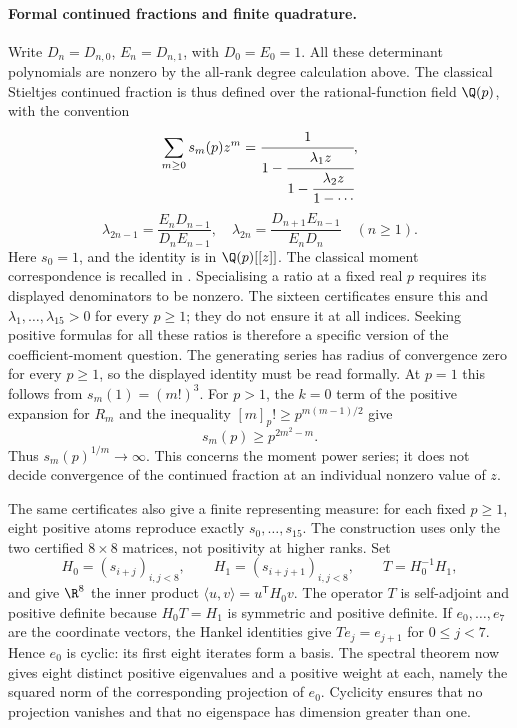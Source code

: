 \paragraph{Formal continued fractions and finite quadrature.}
Write $D_n=D_{n,0}$, $E_n=D_{n,1}$, with $D_0=E_0=1$.
All these determinant polynomials are nonzero by the all-rank degree
calculation above. The classical Stieltjes continued fraction is thus
defined over the rational-function field $\Q(p)$, with the convention
\[
 \sum_{m\ge0}s_m(p)z^m
 =\cfrac{1}{1-\cfrac{\lambda_1z}{1-\cfrac{\lambda_2z}{1-\cdots}}},
\]
\[
 \lambda_{2n-1}=\frac{E_nD_{n-1}}{D_nE_{n-1}},\quad
 \lambda_{2n}=\frac{D_{n+1}E_{n-1}}{E_nD_n}\quad(n\ge1).
\]
Here $s_0=1$, and the identity is in $\Q(p)[[z]]$. The classical
moment correspondence is recalled in \cite[pp.~1--2]{sw2024}.
Specialising a ratio at a fixed real $p$ requires its displayed
denominators to be nonzero. The sixteen certificates ensure this and
$\lambda_1,\ldots,\lambda_{15}>0$ for every $p\ge1$; they do not ensure
it at all indices. Seeking positive formulas for all these ratios is
therefore a specific version of the coefficient-moment question.
The generating series has radius of convergence zero for every
$p\ge1$, so the displayed identity must be read formally. At $p=1$
this follows from $s_m(1)=(m!)^3$. For $p>1$, the $k=0$ term of the
positive expansion for $R_m$ and the inequality
$[m]_p!\ge p^{m(m-1)/2}$ give
\[
 s_m(p)\ge p^{2m^2-m}.
\]
Thus $s_m(p)^{1/m}\to\infty$. This concerns the moment power series;
it does not decide convergence of the continued fraction at an
individual nonzero value of $z$.

The same certificates also give a finite representing measure:
for each fixed $p\ge1$, eight positive atoms reproduce exactly
$s_0,\ldots,s_{15}$. The construction uses only the two certified
$8\times8$ matrices, not positivity at higher ranks. Set
\[
 H_0=(s_{i+j})_{i,j<8},\qquad H_1=(s_{i+j+1})_{i,j<8},\qquad
 T=H_0^{-1}H_1,
\]
and give $\R^8$ the inner product
$\langle u,v\rangle=u^{\mathsf T}H_0v$.
The operator $T$ is self-adjoint and positive definite because
$H_0T=H_1$ is symmetric and positive definite. If $e_0,\ldots,e_7$
are the coordinate vectors, the Hankel identities give
$Te_j=e_{j+1}$ for $0\le j<7$. Hence $e_0$ is cyclic: its first
eight iterates form a basis. The spectral theorem now gives eight
distinct positive eigenvalues and a positive weight at each, namely
the squared norm of the corresponding projection of $e_0$.
Cyclicity ensures that no projection vanishes and that no eigenspace
has dimension greater than one.

